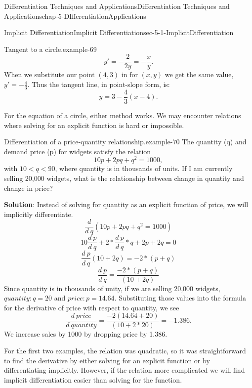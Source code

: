 \documentclass[oneside,10pt,]{book}
\newcommand{\terminology}[1]{\textbf{#1}}
\numberwithin{equation}{section}
\newcommand{\lt}{<}
\begin{document}
\begin{chapterptx}{Differentiation Techniques and Applications}{}{Differentiation Techniques and Applications}{}{}{chap-5-DIfferentiationApplications}
\begin{sectionptx}{Implicit Differentiation}{}{Implicit Differentiation}{}{}{sec-5-1-ImplicitDifferentiation}
\begin{example}{Tangent to a circle.}{example-69}
\begin{equation*}
y'=-\frac{2}{2y}=-\frac{x}{y}.
\end{equation*}
\hypertarget{p-1870}{}%
When we substitute our point \((4,3)\) in for \((x,y)\) we get the same value, \(y'=-\frac{4}{3}\).  Thus the tangent line, in point-slope form, is:%
%
\begin{equation*}
y=3-\frac{4}{3} (x-4).
\end{equation*}
\end{example}
\hypertarget{p-1871}{}%
For the equation of a circle, either method works.  We may encounter relations where solving for an explicit function is hard or impossible.%
\begin{example}{Differentiation of a price-quantity relationship.}{example-70}%
\hypertarget{p-1872}{}%
The quantity (q) and demand price (p) for widgets satisfy the relation%
%
\begin{equation*}
10p+2pq+q^2=1000,
\end{equation*}
\hypertarget{p-1873}{}%
with \(10\lt q\lt 90\), where quantity is in thousands of units.  If I am currently selling 20,000 widgets, what is the relationship between change in quantity and change in price?%
\par
\hypertarget{p-1874}{}%
\terminology{Solution}: Instead of solving for quantity as an explicit function of price, we will implicitly differentiate.%
%
\begin{equation*}
\frac{d}{d\ q}(10p+2pq+q^2=1000)
\end{equation*}
%
\begin{equation*}
10 \frac{d\ p}{d\ q}+2*\frac{d\ p}{d\ q}*q+2p+2q=0
\end{equation*}
%
\begin{equation*}
\frac{d\ p}{d\ q} (10+2q)=-2*(p+q)
\end{equation*}
%
\begin{equation*}
\frac{d\ p}{d\ q}=\frac{-2*(p+q)}{(10+2q) }
\end{equation*}
\hypertarget{p-1875}{}%
Since quantity is in thousands of unity, if we are selling 20,000 widgets, \(quantity:q=20\) and \(price:p=14.64\).  Substituting those values into the formula for the derivative of price with respect to quantity, we see%
%
\begin{equation*}
\frac{d\ price}{d\ quantity}=\frac{-2(14.64+20)}{(10+2*20) }=-1.386.
\end{equation*}
\hypertarget{p-1876}{}%
We increase sales by 1000 by dropping price by \textdollar{}1.386.%
\end{example}
\hypertarget{p-1877}{}%
For the first two examples, the relation was quadratic, so it was straightforward to find the derivative by either solving for an explicit function or by differentiating implicitly.  However, if the relation more complicated we will find implicit differentiation easier than solving for the function.%

\end{sectionptx}
\end{chapterptx}
\end{document}
